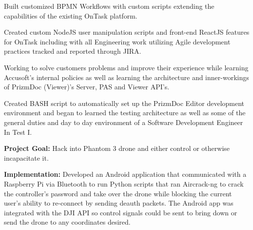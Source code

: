 \documentclass[letterpaper]{deedy-resume} %
\begin{document}
\begin{minipage}[t]{0.66\textwidth}
\begin{tightitemize}
\item Built customized BPMN Workflows with custom scripts extending the capabilities of the existing OnTask platform.
\vspace{\topsep}
\item Created custom NodeJS user manipulation scripts and front-end ReactJS features for OnTask including with all Engineering work utilizing Agile development practices tracked and reported through JIRA.
\vspace{\topsep}

\end{tightitemize}


\vspace{\topsep} %

\begin{tightitemize}
\item Working to solve customers problems and improve their experience while learning Accusoft's internal policies as well as learning the architecture and inner-workings of PrizmDoc (Viewer)'s Server, PAS and Viewer API's.
\vspace{\topsep}
\item Created BASH script to automatically set up the PrizmDoc Editor development environment and began to learned the testing architecture as well as some of the general duties and day to day environment of a Software Development Engineer In Test I.

\end{tightitemize}
\vspace{\topsep} %


\vspace{\topsep} %

\begin{tightitemize}
\item {\bf Project Goal:} Hack into Phantom 3 drone and either control or otherwise incapacitate it.
\vspace{\topsep}
\item {\bf Implementation: } Developed an Android application that communicated with a Raspberry Pi via Bluetooth to run Python scripts that ran Aircrack-ng to crack the controller's password and take over the drone while blocking the current user's ability to re-connect by sending deauth packets. The Android app was integrated with the DJI API so control signals could be sent to bring down or send the drone to any coordinates desired.
\vspace{\topsep}


\end{tightitemize}
\end{minipage}
\end{document}
